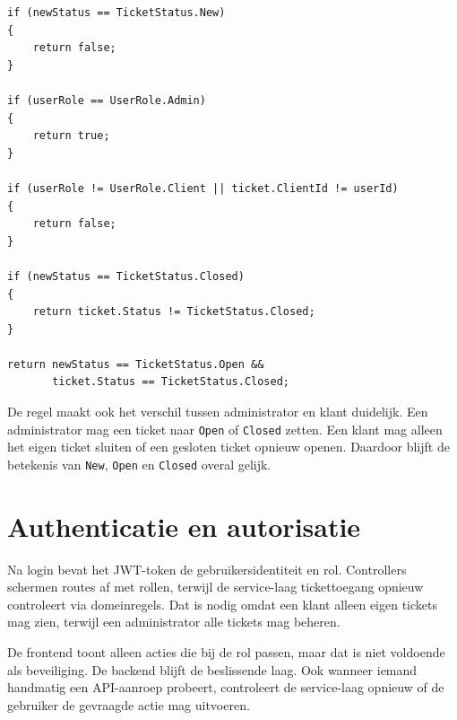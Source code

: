 \begin{listing}[H]
\begin{verbatim}
if (newStatus == TicketStatus.New)
{
    return false;
}

if (userRole == UserRole.Admin)
{
    return true;
}

if (userRole != UserRole.Client || ticket.ClientId != userId)
{
    return false;
}

if (newStatus == TicketStatus.Closed)
{
    return ticket.Status != TicketStatus.Closed;
}

return newStatus == TicketStatus.Open &&
       ticket.Status == TicketStatus.Closed;
\end{verbatim}
\caption[Statuscontrole in TicketRules]{Statuscontrole in \texttt{TicketRules}.}
\label{lst:ticket-rules-status}
\end{listing}

De regel maakt ook het verschil tussen administrator en klant duidelijk. Een administrator mag een ticket naar \texttt{Open} of \texttt{Closed} zetten. Een klant mag alleen het eigen ticket sluiten of een gesloten ticket opnieuw openen. Daardoor blijft de betekenis van \texttt{New}, \texttt{Open} en \texttt{Closed} overal gelijk.

\section{Authenticatie en autorisatie}

Na login bevat het JWT-token de gebruikersidentiteit en rol. Controllers schermen routes af met rollen, terwijl de service-laag tickettoegang opnieuw controleert via domeinregels. Dat is nodig omdat een klant alleen eigen tickets mag zien, terwijl een administrator alle tickets mag beheren.

De frontend toont alleen acties die bij de rol passen, maar dat is niet voldoende als beveiliging. De backend blijft de beslissende laag. Ook wanneer iemand handmatig een API-aanroep probeert, controleert de service-laag opnieuw of de gebruiker de gevraagde actie mag uitvoeren.
